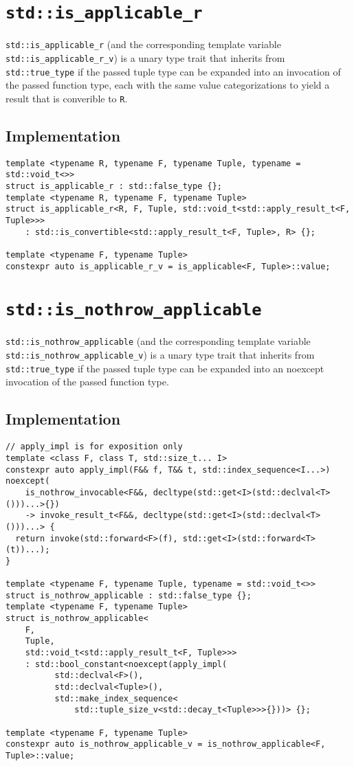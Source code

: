 \documentclass{article}
\begin{document}
\section{\texttt{std::is\_applicable\_r}}
\texttt{std::is\_applicable\_r} (and the corresponding template variable
\texttt{std::is\_applicable\_r\_v}) is a unary type trait that inherits from
\texttt{std::true\_type} if the passed tuple type can be expanded into an
invocation of the passed function type, each with the same value
categorizations to yield a result that is converible to \texttt{R}.

\subsection{Implementation}
\begin{lstlisting}
template <typename R, typename F, typename Tuple, typename = std::void_t<>>
struct is_applicable_r : std::false_type {};
template <typename R, typename F, typename Tuple>
struct is_applicable_r<R, F, Tuple, std::void_t<std::apply_result_t<F, Tuple>>>
    : std::is_convertible<std::apply_result_t<F, Tuple>, R> {};

template <typename F, typename Tuple>
constexpr auto is_applicable_r_v = is_applicable<F, Tuple>::value;
\end{lstlisting}

\section{\texttt{std::is\_nothrow\_applicable}}
\texttt{std::is\_nothrow\_applicable} (and the corresponding template variable
\texttt{std::is\_nothrow\_applicable\_v}) is a unary type trait that inherits
from \texttt{std::true\_type} if the passed tuple type can be expanded into an
noexcept invocation of the passed function type.

\subsection{Implementation}
\begin{lstlisting}
// apply_impl is for exposition only
template <class F, class T, std::size_t... I>
constexpr auto apply_impl(F&& f, T&& t, std::index_sequence<I...>) noexcept(
    is_nothrow_invocable<F&&, decltype(std::get<I>(std::declval<T>()))...>{})
    -> invoke_result_t<F&&, decltype(std::get<I>(std::declval<T>()))...> {
  return invoke(std::forward<F>(f), std::get<I>(std::forward<T>(t))...);
}

template <typename F, typename Tuple, typename = std::void_t<>>
struct is_nothrow_applicable : std::false_type {};
template <typename F, typename Tuple>
struct is_nothrow_applicable<
    F,
    Tuple,
    std::void_t<std::apply_result_t<F, Tuple>>>
    : std::bool_constant<noexcept(apply_impl(
          std::declval<F>(),
          std::declval<Tuple>(),
          std::make_index_sequence<
              std::tuple_size_v<std::decay_t<Tuple>>>{}))> {};

template <typename F, typename Tuple>
constexpr auto is_nothrow_applicable_v = is_nothrow_applicable<F, Tuple>::value;
\end{lstlisting}
\end{document}
